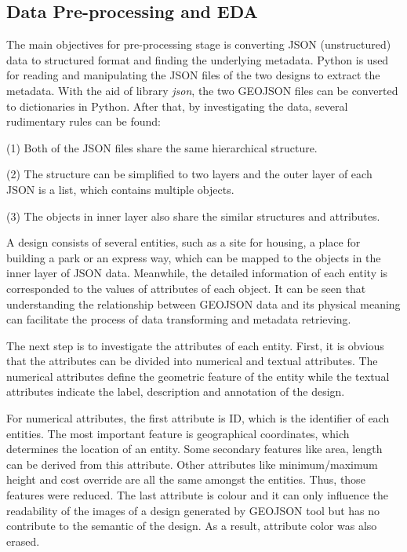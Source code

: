 \subsection*{Data Pre-processing and EDA}
The main objectives for pre-processing stage is converting JSON (unstructured) data to structured format and finding the underlying metadata. Python is used for reading and manipulating the JSON files of the two designs to extract the metadata. With the aid of library \emph{json}, the two GEOJSON files can be converted to dictionaries in Python. After that, by investigating the data, several rudimentary rules can be found:
\par
(1) Both of the JSON files share the same hierarchical structure.
\par
(2) The structure can be simplified to two layers and the outer layer of each JSON is a list, which contains multiple objects.
\par
(3) The objects in inner layer also share the similar structures and attributes.
\par
A design consists of several entities, such as a site for housing, a place for building a park or an express way, which can be mapped to the objects in the inner layer of JSON data. Meanwhile, the detailed information of each entity is corresponded to the values of attributes of each object. It can be seen that understanding the relationship between GEOJSON data and its physical meaning can facilitate the process of data transforming and metadata retrieving.
\par
The next step is to investigate the attributes of each entity. First, it is obvious that the attributes can be divided into numerical and textual attributes. The numerical attributes define the geometric feature of the entity while the textual attributes indicate the label, description and annotation of the design.
\par
For numerical attributes, the first attribute is ID, which is the identifier of each entities. The most important feature is geographical coordinates, which determines the location of an entity. Some secondary features like area, length can be derived from this attribute. Other attributes like minimum/maximum height and cost override are all the same amongst the entities. Thus, those features were reduced. The last attribute is colour and it can only influence the readability of the images of a design generated by GEOJSON tool but has no contribute to the semantic of the design. As a result, attribute color was also erased.
\par
